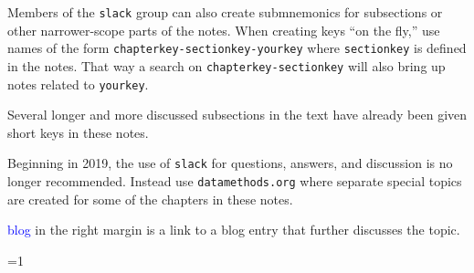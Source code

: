 \documentclass{report}
\begin{document}
Members of
the \verb|slack| group can also create submnemonics for subsections or
other narrower-scope parts of the notes.  When creating keys ``on the
fly,'' use names of the form \verb|chapterkey-sectionkey-yourkey|
where \verb|sectionkey| is defined in the notes.
That way a search on \verb|chapterkey-sectionkey| will also bring up
notes related to \verb|yourkey|.

Several longer and more discussed subsections in the text have already
been given short keys in these notes.

Beginning in 2019, the use of \verb|slack| for questions, answers, and
discussion is no longer recommended.  Instead use
\verb|datamethods.org| where separate special topics are created for
some of the chapters in these notes.

\textcolor{blue}{blog} in the right margin is a link to a blog entry
that further discusses the topic.

\clearpage
{}

\Large

\def\basicStat{0}     %
\ifnum\basicStat=1




%
%
%
%
%
%
%
%
%
%
%
%
%
%
%
%
%
\else





















\fi

\dobib
\end{document}
